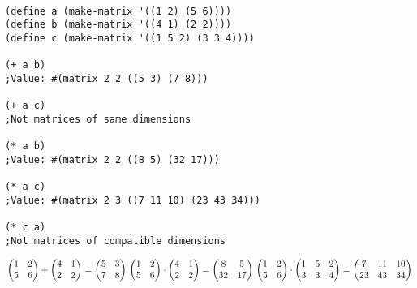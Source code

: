 \documentclass{article}
\begin{document}
\begin{minipage}[t]{0.6\textwidth}
\begin{verbatim}

(define a (make-matrix '((1 2) (5 6))))
(define b (make-matrix '((4 1) (2 2))))
(define c (make-matrix '((1 5 2) (3 3 4))))

(+ a b)
;Value: #(matrix 2 2 ((5 3) (7 8)))

(+ a c)
;Not matrices of same dimensions

(* a b)
;Value: #(matrix 2 2 ((8 5) (32 17)))

(* a c)
;Value: #(matrix 2 3 ((7 11 10) (23 43 34)))

(* c a)
;Not matrices of compatible dimensions
\end{verbatim}
\end{minipage}
\begin{minipage}[t]{0.4\textwidth}
$\\ \\ \\ \\ \\ 
\begin{pmatrix}
1&2\\ 5&6
\end{pmatrix} + 
\begin{pmatrix}
4&1\\ 2&2
\end{pmatrix} = 
\begin{pmatrix}
5&3\\ 7&8
\end{pmatrix} \\ \\ \\ \\ \\ \\ 
\begin{pmatrix}
1&2\\ 5&6
\end{pmatrix} \cdot 
\begin{pmatrix}
4&1\\ 2&2
\end{pmatrix} = 
\begin{pmatrix}
8&5\\ 32&17
\end{pmatrix} \\ \\ \\
\begin{pmatrix}
1&2\\ 5&6
\end{pmatrix} \cdot
\begin{pmatrix}
1&5&2\\ 3&3&4
\end{pmatrix} = 
\begin{pmatrix}
7&11&10\\ 23&43&34
\end{pmatrix}$
 
\end{minipage}
            
\end{document}
